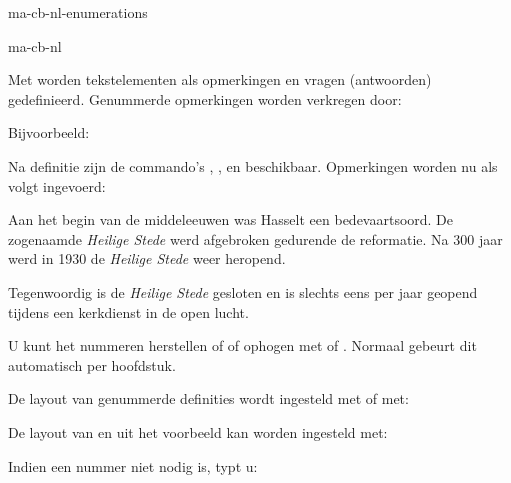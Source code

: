 \startonderdeel ma-cb-nl-enumerations

\produkt ma-cb-nl




Met \type{\doornummeren} worden tekstelementen als
opmerkingen en vragen (antwoorden) gedefinieerd.
Genummerde opmerkingen worden verkregen door:


Bijvoorbeeld:

\startbuffer[a]
\doornummeren
  [opmerking]
  [plaats=boven,
   tekst=Opmerking,
   tussen=\blanko,
   na=\blanko]
\stopbuffer

\typebuffer[a]

Na definitie zijn de commando's \type{\opmerking},
\type{\subopmerking}, \type{\resetopmerking} en
\type{\volgendeopmerking} beschikbaar. Opmerkingen worden nu
als volgt ingevoerd:

\startbuffer[b]
\opmerking Aan het begin van de middeleeuwen was Hasselt een
bedevaartsoord. De zogenaamde {\em Heilige Stede} werd
afgebroken gedurende de reformatie. Na 300 jaar werd in 1930
de {\em Heilige Stede} weer heropend.

\subopmerking Tegenwoordig is de {\em Heilige Stede} gesloten
en is slechts eens per jaar geopend tijdens een kerkdienst in
de open lucht. \par
\stopbuffer

\typebuffer[b]

\start
\haalbuffer[a]\haalbuffer[b]
\stop

U kunt het nummeren herstellen \type{\resetopmerking} of
\type{\resetsubopmerking} of ophogen met
\type{\volgendeopmerking} of \type{\volgendesubopmerking}.
Normaal gebeurt dit automatisch per hoofdstuk.

De layout van genummerde definities wordt ingesteld met
\type{\doornummeren} of met:


De layout van \type{\opmerking} en \type{\subopmerking} uit
het voorbeeld kan worden ingesteld met:

\starttypen
\steldoornummerenin[opmerking][kopletter=vet]
\steldoornummerenin[subopmerking][kopletter=schuin]
\stoptypen

Indien een nummer niet nodig is, typt u:

